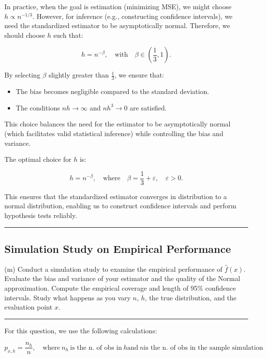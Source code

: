 \documentclass{article}
\newenvironment{colorparagraph}[1]{\par\color{#1}}{\par}
\begin{document}
In practice, when the goal is estimation (minimizing MSE), we might choose \( h \propto n^{-1/3} \). However, for inference (e.g., constructing confidence intervals), we need the standardized estimator to be asymptotically normal. Therefore, we should choose \( h \) such that:

\[
h = n^{-\beta}, \quad \text{with} \quad \beta \in \left( \frac{1}{3}, 1 \right).
\]

By selecting \( \beta \) slightly greater than \( \frac{1}{3} \), we ensure that:

\begin{itemize}
    \item The bias becomes negligible compared to the standard deviation.
    \item The conditions \( n h \to \infty \) and \( n h^3 \to 0 \) are satisfied.
\end{itemize}

This choice balances the need for the estimator to be asymptotically normal (which facilitates valid statistical inference) while controlling the bias and variance.

The optimal choice for \( h \) is:

\[
h = n^{-\beta}, \quad \text{where} \quad \beta = \frac{1}{3} + \varepsilon, \quad \varepsilon > 0.
\]

This ensures that the standardized estimator converges in distribution to a normal distribution, enabling us to construct confidence intervals and perform hypothesis tests reliably.

\begin{colorparagraph}{questioncolor}
\label{q2m}
\rule{\textwidth}{0.5pt}
\subsection{Simulation Study on Empirical Performance}
(m) Conduct a simulation study to examine the empirical performance of \( \hat{f}(x) \). Evaluate the bias and variance of your estimator and the quality of the Normal approximation. Compute the empirical coverage and length of 95\% confidence intervals. Study what happens as you vary \( n \), \( h \), the true distribution, and the evaluation point \( x \).

\rule{\textwidth}{0.5pt}
\end{colorparagraph}

For this question, we use the following calculations:

$$
p_{x, h} = \frac{n_h}{n}, \quad \text{where} \ n_h \ \text{is the n. of obs in} \ h \text{and} \ n \text{is the n. of obs in the sample simulation}
$$
\end{document}
